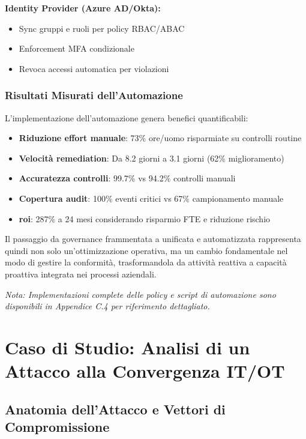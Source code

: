 \textbf{Identity Provider (Azure AD/Okta):}
\begin{itemize}
    \item Sync gruppi e ruoli per policy RBAC/ABAC
    \item Enforcement MFA condizionale
    \item Revoca accessi automatica per violazioni
\end{itemize}

\subsubsection{Risultati Misurati dell'Automazione}

L'implementazione dell'automazione genera benefici quantificabili:

\begin{itemize}
    \item \textbf{Riduzione effort manuale}: 73\% ore/uomo risparmiate su controlli routine
    \item \textbf{Velocità remediation}: Da 8.2 giorni a 3.1 giorni (62\% miglioramento)
    \item \textbf{Accuratezza controlli}: 99.7\% vs 94.2\% controlli manuali
    \item \textbf{Copertura audit}: 100\% eventi critici vs 67\% campionamento manuale
    \item \textbf{\gls{roi}}: 287\% a 24 mesi considerando risparmio FTE e riduzione rischio
\end{itemize}

Il passaggio da governance frammentata a unificata e automatizzata rappresenta quindi non solo un'ottimizzazione operativa, ma un cambio fondamentale nel modo di gestire la conformità, trasformandola da attività reattiva a capacità proattiva integrata nei processi aziendali.

\textit{Nota: Implementazioni complete delle policy e script di automazione sono disponibili in Appendice C.4 per riferimento dettagliato.}

\section{\texorpdfstring{\textbf{Caso di Studio: Analisi di un Attacco alla Convergenza IT/OT}}{4.5 - Caso di Studio: Analisi di un Attacco alla Convergenza IT/OT}}

\subsection{Anatomia dell'Attacco e Vettori di Compromissione}

